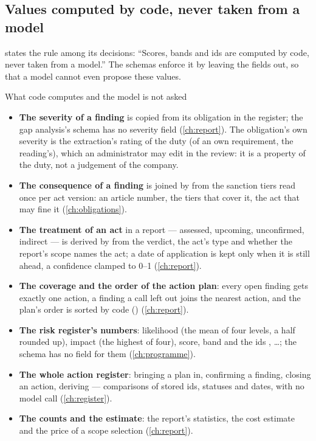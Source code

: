 \subsection{Values computed by code, never taken from a model}\label{sec:control:computed}

 states the rule among its decisions: \enquote{Scores, bands and
ids are computed by code, never taken from a model.} The schemas enforce it by leaving the
fields out, so that a model cannot even propose these values.

\begin{codebox}{What code computes and the model is not asked}
\begin{itemize}
  \item \textbf{The severity of a finding} is copied from its obligation in the register; the
    gap analysis's schema has no severity field (\cref{ch:report}). The obligation's own
    severity is the extraction's rating of the duty (of an own requirement, the reading's),
    which an administrator may edit in the review: it is a property of the duty, not a
    judgement of the company.
  \item \textbf{The consequence of a finding} is joined by  from the
    sanction tiers read once per act version: an article number, the tiers that cover it,
    the act that may fine it (\cref{ch:obligations}).
  \item \textbf{The treatment of an act} in a report --- assessed, upcoming, unconfirmed,
    indirect --- is derived by  from the verdict, the act's type and
    whether the report's scope names the act; a date of application
    is kept only when it is still ahead, a confidence clamped to 0--1 (\cref{ch:report}).
  \item \textbf{The coverage and the order of the action plan}: every open finding gets
    exactly one action, a finding a call left out joins the nearest action, and the plan's
    order is sorted by code () (\cref{ch:report}).
  \item \textbf{The risk register's numbers}: likelihood (the mean of four levels, a half
    rounded up), impact (the highest of four), score, band and the ids , \ldots;
    the schema has no field for them (\cref{ch:programme}).
  \item \textbf{The whole action register}: bringing a plan in, confirming a finding,
    closing an action, deriving  --- comparisons of stored ids, statuses and
    dates, with no model call (\cref{ch:register}).
  \item \textbf{The counts and the estimate}: the report's statistics, the cost estimate and
    the price of a scope selection (\cref{ch:report}).
\end{itemize}
\end{codebox}

